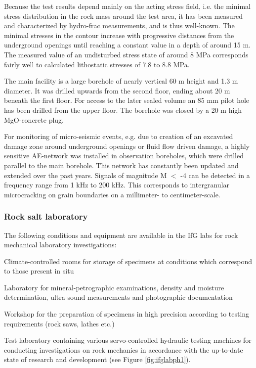 Because the test results depend mainly on the acting stress field, i.e. the minimal stress distribution in the rock mass around the test area, it has been measured and  characterized by hydro-frac measurements, and is thus well-known. The minimal stresses in the contour increase with progressive distances from the underground openings until reaching a constant value in a depth of around 15 m. The measured value of an undisturbed stress state of around 8 MPa corresponds fairly well to calculated lithostatic stresses of 7.8 to 8.8 MPa. 

The main facility is a large borehole of nearly vertical 60 m height and 1.3 m diameter. It was drilled upwards from the second floor, ending about 20 m beneath the first floor. For access to the later sealed volume an 85 mm pilot hole has been drilled from the upper floor. The borehole was closed by a 20 m high MgO-concrete plug. 

For monitoring of micro-seismic events, e.g. due to creation of an excavated damage zone around underground openings or fluid flow driven damage, a highly sensitive AE-network was installed in observation boreholes, which were drilled parallel to the main borehole. This network has constantly been updated and extended over the past years. Signals of magnitude M $<$ -4 can be detected in a frequency range from 1 kHz to 200 kHz. This corresponds to intergranular microcracking on grain boundaries on a millimeter- to centimeter-scale. 

\subsubsection{Rock salt laboratory}

The following conditions and equipment are available in the IfG labs for rock mechanical laboratory investigations:

\begin{list}{-}{\leftmargin=1em \itemindent=0em \itemsep=0.1em}
\item Climate-controlled rooms for storage of specimens at conditions which correspond to those present in situ
\item Laboratory for mineral-petrographic examinations, density and moisture determination, ultra-sound measurements and 
photographic documentation
\item Workshop for the preparation of specimens in high precision according to testing requirements (rock saws, lathes etc.)
\item Test laboratory containing various servo-controlled hydraulic testing machines for conducting investigations on 
rock mechanics in accordance with the up-to-date state of research and development (see Figure \ref{fig:ifglabph1}).
\end{list} 


